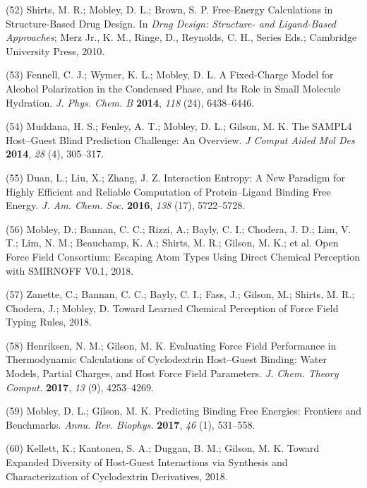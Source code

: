 \documentclass[11pt,notitlepage]{article}
\begin{document}
\leavevmode\hypertarget{ref-fC0t6Cy1}{}%
(52) Shirts, M. R.; Mobley, D. L.; Brown, S. P. Free-Energy Calculations
in Structure-Based Drug Design. In \emph{Drug Design: Structure- and
Ligand-Based Approaches}; Merz Jr., K. M., Ringe, D., Reynolds, C. H.,
Series Eds.; Cambridge University Press, 2010.

\leavevmode\hypertarget{ref-LOjcxYqt}{}%
(53) Fennell, C. J.; Wymer, K. L.; Mobley, D. L. A Fixed-Charge Model
for Alcohol Polarization in the Condensed Phase, and Its Role in Small
Molecule Hydration. \emph{J. Phys. Chem. B} \textbf{2014}, \emph{118}
(24), 6438--6446.

\leavevmode\hypertarget{ref-GA1AFcUw}{}%
(54) Muddana, H. S.; Fenley, A. T.; Mobley, D. L.; Gilson, M. K. The
SAMPL4 Host--Guest Blind Prediction Challenge: An Overview. \emph{J
Comput Aided Mol Des} \textbf{2014}, \emph{28} (4), 305--317.

\leavevmode\hypertarget{ref-gRfhPG7N}{}%
(55) Duan, L.; Liu, X.; Zhang, J. Z. Interaction Entropy: A New Paradigm
for Highly Efficient and Reliable Computation of Protein--Ligand Binding
Free Energy. \emph{J. Am. Chem. Soc.} \textbf{2016}, \emph{138} (17),
5722--5728.

\leavevmode\hypertarget{ref-HlBr7NrU}{}%
(56) Mobley, D.; Bannan, C. C.; Rizzi, A.; Bayly, C. I.; Chodera, J. D.;
Lim, V. T.; Lim, N. M.; Beauchamp, K. A.; Shirts, M. R.; Gilson, M. K.;
et al. Open Force Field Consortium: Escaping Atom Types Using Direct
Chemical Perception with SMIRNOFF V0.1, 2018.

\leavevmode\hypertarget{ref-13lTSBgHy}{}%
(57) Zanette, C.; Bannan, C. C.; Bayly, C. I.; Fass, J.; Gilson, M.;
Shirts, M. R.; Chodera, J.; Mobley, D. Toward Learned Chemical
Perception of Force Field Typing Rules, 2018.

\leavevmode\hypertarget{ref-HVgz5rZq}{}%
(58) Henriksen, N. M.; Gilson, M. K. Evaluating Force Field Performance
in Thermodynamic Calculations of Cyclodextrin Host--Guest Binding: Water
Models, Partial Charges, and Host Force Field Parameters. \emph{J. Chem.
Theory Comput.} \textbf{2017}, \emph{13} (9), 4253--4269.

\leavevmode\hypertarget{ref-12BD3oHp4}{}%
(59) Mobley, D. L.; Gilson, M. K. Predicting Binding Free Energies:
Frontiers and Benchmarks. \emph{Annu. Rev. Biophys.} \textbf{2017},
\emph{46} (1), 531--558.

\leavevmode\hypertarget{ref-13gqBX78S}{}%
(60) Kellett, K.; Kantonen, S. A.; Duggan, B. M.; Gilson, M. K. Toward
Expanded Diversity of Host-Guest Interactions via Synthesis and
Characterization of Cyclodextrin Derivatives, 2018.
\end{document}

